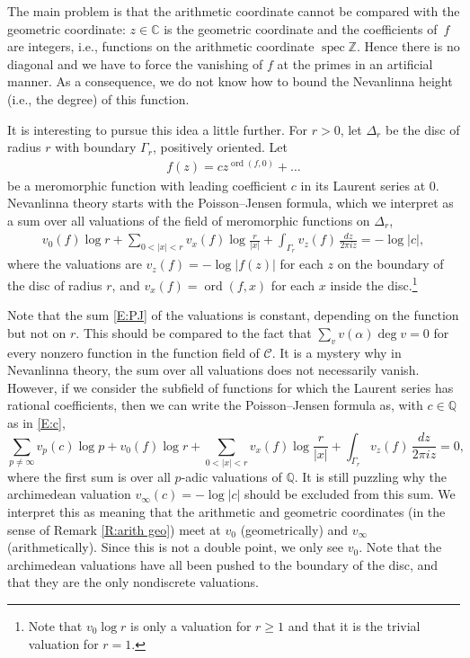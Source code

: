 \documentclass{amsart}
\newcommand\ord{\operatorname{ord}}
\newcommand\Z{\mathbb{Z}}	\newcommand\C{\mathbb{C}}
\newcommand\Q{\mathbb{Q}}	\newcommand\R{\mathbb{R}}
\newcommand\spec{\operatorname{spec}}
\newcommand\Curve{\mathcal{C}}
\theoremstyle{definition}\newtheorem{definition}[theorem]{Definition}
\theoremstyle{remark}\newtheorem{remark}[theorem]{Remark}
\numberwithin{equation}{section}
\begin{document}
The main problem is that the arithmetic coordinate cannot be compared with the geometric coordinate:
$z\in\C$ is the geometric coordinate and the coefficients of~$f$ are integers,
i.e.,
functions on the arithmetic coordinate $\spec\Z$.
Hence there is no diagonal and we have to force the vanishing of $f$ at the primes in an artificial manner.
As a consequence,
we do not know how to bound the Nevanlinna height (i.e.,
the degree) of this function.\medskip

It is interesting to pursue this idea a little further.
For $r>0$,
let $\Delta_r$ be the disc of radius $r$ with boundary $\Gamma_r$,
positively oriented.
Let
\begin{gather}\label{E:c}
f(z)=cz^{\ord(f,0)}+\dots
\end{gather}
be a meromorphic function with leading coefficient $c$ in its Laurent series at $0$.
Nevanlinna theory starts with the Poisson--Jensen formula,
which we interpret as a sum over all valuations of the field of meromorphic functions on $\Delta_r$,
\begin{gather}\label{E:PJ}
v_0(f)\log r+\sum_{0<|x|<r}v_{x}(f)\log\frac r{|x|}+\int_{\Gamma_r}v_z(f)\,\frac{dz}{2\pi iz}=-\log|c|,
\end{gather}
where the valuations are $v_z(f)=-\log|f(z)|$ for each $z$ on the boundary of the disc of radius $r$,
and $v_{x}(f)=\ord(f,x)$ for each $x$ inside the disc.\footnote
{Note that $v_0\log r$ is only a valuation for $r\geq1$ and that it is the trivial valuation for $r=1$.}

Note that the sum \eqref{E:PJ} of the valuations is constant,
depending on the function but not on $r$.
This should be compared to the fact that $\sum_vv(\alpha)\deg v=0$ for every nonzero function in the function field of $\Curve$.
It is a mystery why in Nevanlinna theory,
the sum over all valuations does not necessarily vanish.
However,
if we consider the subfield of functions for which the Laurent series has rational coefficients,
then we can write the Poisson--Jensen formula as,
with $c\in\Q$ as in \eqref{E:c},
$$
\sum_{p\neq\infty}v_p(c)\log p+v_0(f)\log r+\sum_{0<|x|<r}v_{x}(f)\log\frac r{|x|}+\int_{\Gamma_r}v_z(f)\,\frac{dz}{2\pi iz}=0,
$$
where the first sum is over all $p$-adic valuations of $\Q$.
It is still puzzling why the archimedean valuation $v_\infty(c)=-\log|c|$ should be excluded from this sum.
We interpret this as meaning that the arithmetic and geometric coordinates (in the sense of Remark \ref{R:arith geo}) meet at $v_{0}$ (geometrically) and $v_\infty$ (arithmetically).
Since this is not a double point,
we only see $v_{0}$.
Note that the archimedean valuations have all been pushed to the boundary of the disc,
and that they are the only nondiscrete valuations.
\end{document}
